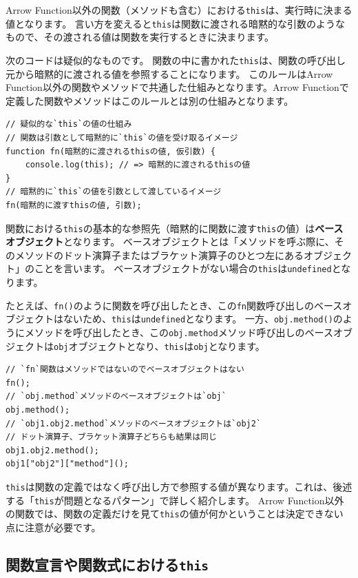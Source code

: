Arrow
Function以外の関数（メソッドも含む）における\texttt{this}は、実行時に決まる値となります。
言い方を変えると\texttt{this}は関数に渡される暗黙的な引数のようなもので、その渡される値は関数を実行するときに決まります。

次のコードは疑似的なものです。
関数の中に書かれた\texttt{this}は、関数の呼び出し元から暗黙的に渡される値を参照することになります。
このルールはArrow
Function以外の関数やメソッドで共通した仕組みとなります。Arrow
Functionで定義した関数やメソッドはこのルールとは別の仕組みとなります。

\begin{lstlisting}
// 疑似的な`this`の値の仕組み
// 関数は引数として暗黙的に`this`の値を受け取るイメージ
function fn(暗黙的に渡されるthisの値, 仮引数) {
    console.log(this); // => 暗黙的に渡されるthisの値
}
// 暗黙的に`this`の値を引数として渡しているイメージ
fn(暗黙的に渡すthisの値, 引数);
\end{lstlisting}

関数における\texttt{this}の基本的な参照先（暗黙的に関数に渡す\texttt{this}の値）は\textbf{ベースオブジェクト}となります。
ベースオブジェクトとは「メソッドを呼ぶ際に、そのメソッドのドット演算子またはブラケット演算子のひとつ左にあるオブジェクト」のことを言います。
ベースオブジェクトがない場合の\texttt{this}は\texttt{undefined}となります。

たとえば、\texttt{fn()}のように関数を呼び出したとき、この\texttt{fn}関数呼び出しのベースオブジェクトはないため、\texttt{this}は\texttt{undefined}となります。
一方、\texttt{obj.method()}のようにメソッドを呼び出したとき、この\texttt{obj.method}メソッド呼び出しのベースオブジェクトは\texttt{obj}オブジェクトとなり、\texttt{this}は\texttt{obj}となります。

\begin{lstlisting}
// `fn`関数はメソッドではないのでベースオブジェクトはない
fn();
// `obj.method`メソッドのベースオブジェクトは`obj`
obj.method();
// `obj1.obj2.method`メソッドのベースオブジェクトは`obj2`
// ドット演算子、ブラケット演算子どちらも結果は同じ
obj1.obj2.method();
obj1["obj2"]["method"]();
\end{lstlisting}

\texttt{this}は関数の定義ではなく呼び出し方で参照する値が異なります。これは、後述する「\texttt{this}が問題となるパターン」で詳しく紹介します。
Arrow
Function以外の関数では、関数の定義だけを見て\texttt{this}の値が何かということは決定できない点に注意が必要です。

\hypertarget{function-declaration-expression-this}{%
\subsection{\texorpdfstring{関数宣言や関数式における\texttt{this}}{関数宣言や関数式におけるthis}}\label{function-declaration-expression-this}}

